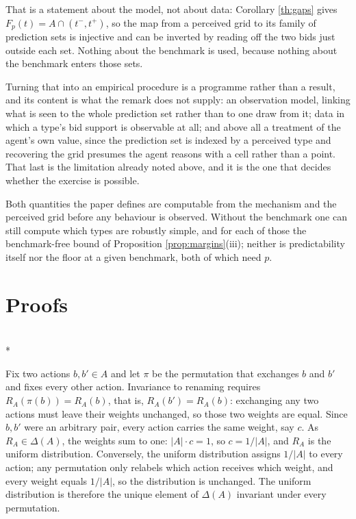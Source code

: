 \documentclass[12pt]{article}
\makeatletter
\theoremstyle{definition}
\renewenvironment{proof}[1][\proofname]{\par
  \pushQED{\qed}%
  \normalfont \topsep6\p@\@plus6\p@\relax
  \trivlist
  \item[\hskip\labelsep\itshape #1\@addpunct{.}]\mbox{}\\*
  \ignorespaces
}{%
  \popQED\endtrivlist\@endpefalse
}
\makeatother
\begin{document}
That is a statement about the model, not about data: Corollary \ref{th:gaps} gives $F_p(t) = A \cap (t^-, t^+)$, so the map from a perceived grid to its family of prediction sets is injective and can be inverted by reading off the two bids just outside each set. Nothing about the benchmark is used, because nothing about the benchmark enters those sets.

Turning that into an empirical procedure is a programme rather than a result, and its content is what the remark does not supply: an observation model, linking what is seen to the whole prediction set rather than to one draw from it; data in which a type's bid support is observable at all; and above all a treatment of the agent's own value, since the prediction set is indexed by a perceived type and recovering the grid presumes the agent reasons with a cell rather than a point. That last is the limitation already noted above, and it is the one that decides whether the exercise is possible.

Both quantities the paper defines are computable from the mechanism and the perceived grid before any behaviour is observed. Without the benchmark one can still compute which types are robustly simple, and for each of those the benchmark-free bound of Proposition \ref{prop:margins}(iii); neither is predictability itself nor the floor at a given benchmark, both of which need $p$.

\appendix

\section{Proofs}\label{app:proofs}

\begin{proof}[Proof of Proposition \ref{prop:reference}]
Fix two actions $b, b' \in A$ and let $\pi$ be the permutation that exchanges $b$ and $b'$ and fixes every other action. Invariance to renaming requires $R_A(\pi(b)) = R_A(b)$, that is, $R_A(b') = R_A(b)$: exchanging any two actions must leave their weights unchanged, so those two weights are equal. Since $b, b'$ were an arbitrary pair, every action carries the same weight, say $c$. As $R_A \in \Delta(A)$, the weights sum to one: $|A| \cdot c = 1$, so $c = 1/|A|$, and $R_A$ is the uniform distribution. Conversely, the uniform distribution assigns $1/|A|$ to every action; any permutation only relabels which action receives which weight, and every weight equals $1/|A|$, so the distribution is unchanged. The uniform distribution is therefore the unique element of $\Delta(A)$ invariant under every permutation.
\end{proof}
\end{document}
